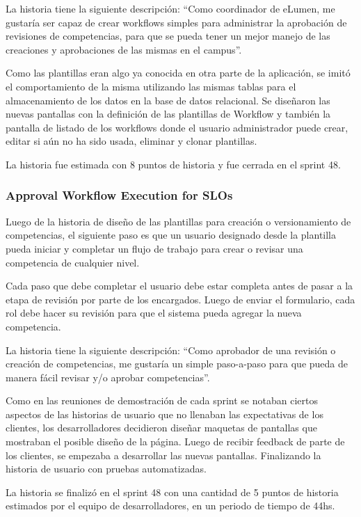 La historia tiene la siguiente descripción: “Como coordinador de eLumen, me gustaría ser capaz de crear workflows simples para administrar la aprobación de revisiones de competencias, para que se pueda tener un mejor manejo de las creaciones y aprobaciones de las mismas en el campus”.

Como las plantillas eran algo ya conocida en otra parte de la aplicación, se imitó el comportamiento de la misma utilizando las mismas tablas para el almacenamiento de los datos en la base de datos relacional. Se diseñaron las nuevas pantallas con la definición de las plantillas de Workflow y también la pantalla de listado de los workflows donde el usuario administrador puede crear, editar si aún no ha sido usada, eliminar y clonar plantillas.

La historia fue estimada con 8 puntos de historia y fue cerrada en el sprint 48.

\subsubsection{Approval Workflow Execution for SLOs}
Luego de la historia de diseño de las plantillas para creación o versionamiento de competencias, el siguiente paso es que un usuario designado desde la plantilla pueda iniciar y completar un flujo de trabajo para crear o revisar una competencia de cualquier nivel.

Cada paso que debe completar el usuario debe estar completa antes de pasar a la etapa de revisión por parte de los encargados. Luego de enviar el formulario, cada rol debe hacer su revisión para que el sistema pueda agregar la nueva competencia.

La historia tiene la siguiente descripción: “Como aprobador de una revisión o creación de competencias, me gustaría un simple paso-a-paso para que pueda de manera fácil revisar y/o aprobar competencias”.

Como en las reuniones de demostración de cada sprint se notaban ciertos aspectos de las historias de usuario que no llenaban las expectativas de los clientes, los desarrolladores decidieron diseñar maquetas de pantallas que mostraban el posible diseño de la página. Luego de recibir feedback de parte de los clientes, se empezaba a desarrollar las nuevas pantallas. Finalizando la historia de usuario con pruebas automatizadas.

La historia se finalizó en el sprint 48 con una cantidad de 5 puntos de historia estimados por el equipo de desarrolladores, en un periodo de tiempo de 44hs.

